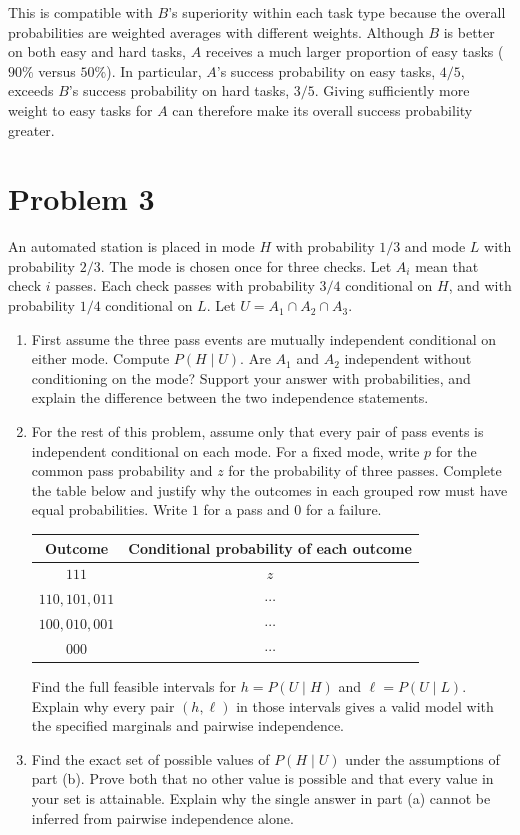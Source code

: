 \documentclass[11pt,a4paper]{article}
\newcommand{\Prob}{P}
\begin{document}
\begin{enumerate}
This is compatible with $B$'s superiority within each task type because
the overall probabilities are weighted averages with different weights.
Although $B$ is better on both easy and hard tasks, $A$ receives a much
larger proportion of easy tasks ($90\%$ versus $50\%$). In particular,
$A$'s success probability on easy tasks, $4/5$, exceeds $B$'s success
probability on hard tasks, $3/5$. Giving sufficiently more weight to easy
tasks for $A$ can therefore make its overall success probability greater.
\end{enumerate}

\clearpage
\section*{Problem 3}
An automated station is placed in mode $H$ with probability $1/3$ and mode $L$ with probability $2/3$. The mode is chosen once for three checks. Let $A_i$ mean that check $i$ passes. Each check passes with probability $3/4$ conditional on $H$, and with probability $1/4$ conditional on $L$. Let $U=A_1\cap A_2\cap A_3$.
\begin{enumerate}
\item First assume the three pass events are mutually independent conditional on either mode. Compute $\Prob(H\mid U)$. Are $A_1$ and $A_2$ independent without conditioning on the mode? Support your answer with probabilities, and explain the difference between the two independence statements.
\item For the rest of this problem, assume only that every pair of pass events is independent conditional on each mode. For a fixed mode, write $p$ for the common pass probability and $z$ for the probability of three passes. Complete the table below and justify why the outcomes in each grouped row must have equal probabilities. Write $1$ for a pass and $0$ for a failure.
\begin{center}
\begin{tabular}{cc}
\toprule Outcome & Conditional probability of each outcome\\\midrule
$111$ & $z$\\
$110,101,011$ & $\cdots$\\
$100,010,001$ & $\cdots$\\
$000$ & $\cdots$\\\bottomrule
\end{tabular}
\end{center}
Find the full feasible intervals for $h=\Prob(U\mid H)$ and $\ell=\Prob(U\mid L)$. Explain why every pair $(h,\ell)$ in those intervals gives a valid model with the specified marginals and pairwise independence.
\item Find the exact set of possible values of $\Prob(H\mid U)$ under the assumptions of part (b). Prove both that no other value is possible and that every value in your set is attainable. Explain why the single answer in part (a) cannot be inferred from pairwise independence alone.
\end{enumerate}
\end{document}
